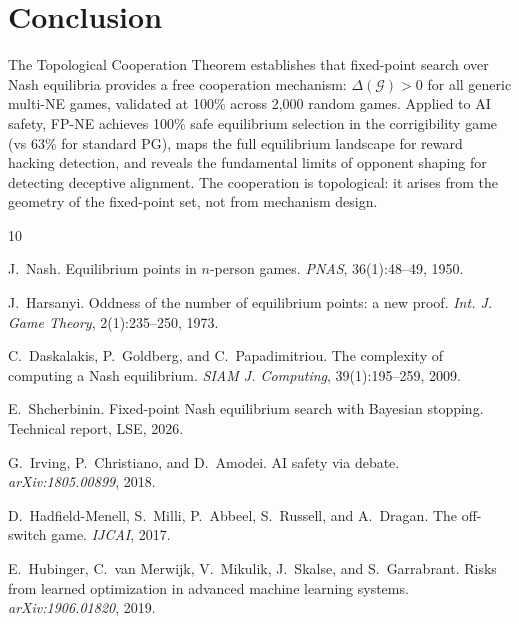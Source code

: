 \documentclass[11pt,a4paper]{article}
\begin{document}
\section{Conclusion}

The Topological Cooperation Theorem establishes that fixed-point
search over Nash equilibria provides a free cooperation mechanism:
$\Delta(\mathcal{G}) > 0$ for all generic multi-NE games, validated
at 100\% across 2,000 random games. Applied to AI safety, FP-NE
achieves 100\% safe equilibrium selection in the corrigibility game
(vs 63\% for standard PG), maps the full equilibrium landscape for
reward hacking detection, and reveals the fundamental limits of
opponent shaping for detecting deceptive alignment. The cooperation
is topological: it arises from the geometry of the fixed-point set,
not from mechanism design.



\begin{thebibliography}{10}

J.~Nash. Equilibrium points in $n$-person games.
\emph{PNAS}, 36(1):48--49, 1950.

J.~Harsanyi. Oddness of the number of equilibrium points: a new proof.
\emph{Int. J. Game Theory}, 2(1):235--250, 1973.

C.~Daskalakis, P.~Goldberg, and C.~Papadimitriou.
The complexity of computing a Nash equilibrium.
\emph{SIAM J. Computing}, 39(1):195--259, 2009.

E.~Shcherbinin. Fixed-point Nash equilibrium search with Bayesian
stopping. Technical report, LSE, 2026.

G.~Irving, P.~Christiano, and D.~Amodei.
AI safety via debate. \emph{arXiv:1805.00899}, 2018.

D.~Hadfield-Menell, S.~Milli, P.~Abbeel, S.~Russell, and A.~Dragan.
The off-switch game. \emph{IJCAI}, 2017.

E.~Hubinger, C.~van Merwijk, V.~Mikulik, J.~Skalse, and S.~Garrabrant.
Risks from learned optimization in advanced machine learning systems.
\emph{arXiv:1906.01820}, 2019.

\end{thebibliography}
\end{document}
